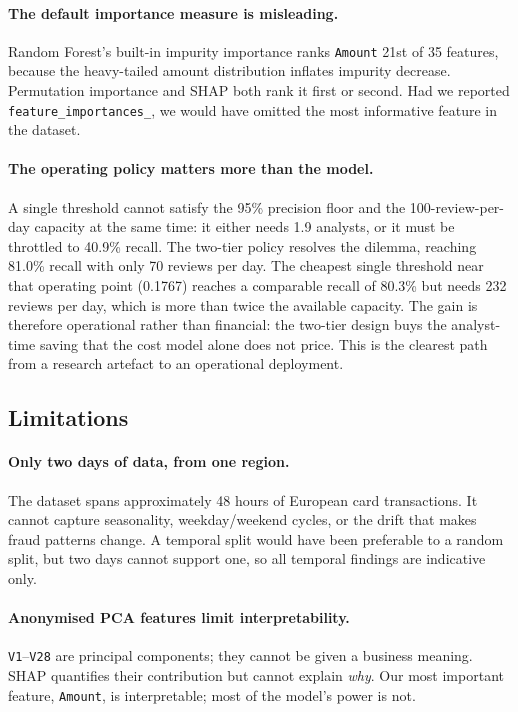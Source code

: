 \paragraph*{The default importance measure is misleading.} Random Forest's
built-in impurity importance ranks \texttt{Amount} 21st of 35 features,
because the heavy-tailed amount distribution inflates impurity decrease.
Permutation importance and SHAP both rank it first or second. Had we reported
\texttt{feature\_importances\_}, we would have omitted the most informative
feature in the dataset.

\paragraph*{The operating policy matters more than the model.} A single
threshold cannot satisfy the 95\% precision floor and the 100-review-per-day
capacity at the same time: it either needs 1.9 analysts, or it must be
throttled to 40.9\% recall. The two-tier policy resolves the dilemma, reaching
81.0\% recall with only 70 reviews per day. The cheapest single threshold
near that operating point (0.1767) reaches a comparable recall of 80.3\% but
needs 232 reviews per day, which is more than twice the available capacity. The gain is therefore
operational rather than financial: the two-tier design buys the analyst-time
saving that the cost model alone does not price. This is the clearest path from
a research artefact to an operational deployment.

\subsection{Limitations}

\paragraph*{Only two days of data, from one region.} The dataset spans
approximately 48 hours of European card transactions. It cannot capture
seasonality, weekday/weekend cycles, or the drift that makes fraud patterns
change. A temporal split would have been preferable to a random split, but two
days cannot support one, so all temporal findings are indicative only.

\paragraph*{Anonymised PCA features limit interpretability.} \texttt{V1}--\texttt{V28}
are principal components; they cannot be given a business meaning. SHAP
quantifies their contribution but cannot explain \emph{why}. Our most important
feature, \texttt{Amount}, is interpretable; most of the model's power is not.

